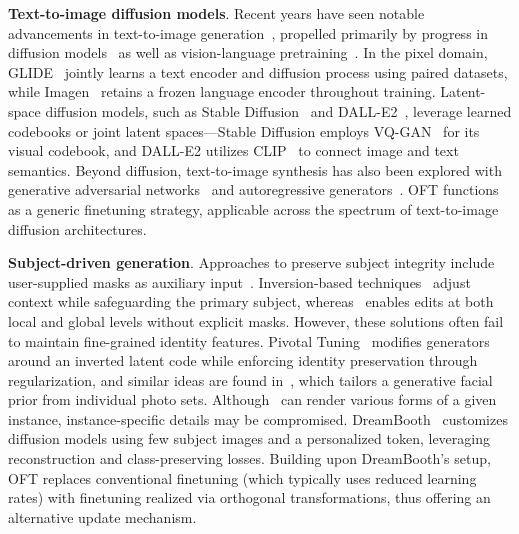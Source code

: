 \textbf{Text-to-image diffusion models}. Recent years have seen notable advancements in text-to-image generation~\cite{saharia2022photorealistic,ramesh2022hierarchical,rombach2022high,gu2022vector,nichol2022glide}, propelled primarily by progress in diffusion models~\cite{ho2020denoising,song2021score,song2021denoising,dhariwal2021diffusion} as well as vision-language pretraining~\cite{su2020vlbert,lu2019vilbert,radford2021learning,wang2021simvlm,li2022blip,li2023blip,alayrac2022flamingo,schuhmann2022laion}. In the pixel domain, GLIDE~\cite{nichol2022glide} jointly learns a text encoder and diffusion process using paired datasets, while Imagen~\cite{saharia2022photorealistic} retains a frozen language encoder throughout training. Latent-space diffusion models, such as Stable Diffusion~\cite{rombach2022high} and DALL-E2~\cite{ramesh2022hierarchical}, leverage learned codebooks or joint latent spaces—Stable Diffusion employs VQ-GAN~\cite{esser2021taming} for its visual codebook, and DALL-E2 utilizes CLIP~\cite{radford2021learning} to connect image and text semantics. Beyond diffusion, text-to-image synthesis has also been explored with generative adversarial networks~\cite{reed2016generative,zhang2017stackgan,xu2018attngan,li2019controllable} and autoregressive generators~\cite{ramesh2021zero,ding2021cogview,wu2022nuwa,yuscaling}. OFT functions as a generic finetuning strategy, applicable across the spectrum of text-to-image diffusion architectures.

\textbf{Subject-driven generation}. Approaches to preserve subject integrity include user-supplied masks as auxiliary input~\cite{avrahami2022blended,nichol2022glide}. Inversion-based techniques~\cite{choi2021ilvr,dhariwal2021diffusion,ramesh2022hierarchical,gal2022image} adjust context while safeguarding the primary subject, whereas~\cite{hertz2022prompt} enables edits at both local and global levels without explicit masks. However, these solutions often fail to maintain fine-grained identity features. Pivotal Tuning~\cite{roich2022pivotal} modifies generators around an inverted latent code while enforcing identity preservation through regularization, and similar ideas are found in~\cite{nitzan2022mystyle}, which tailors a generative facial prior from individual photo sets. Although~\cite{casanova2021instance} can render various forms of a given instance, instance-specific details may be compromised. DreamBooth~\cite{ruiz2023dreambooth} customizes diffusion models using few subject images and a personalized token, leveraging reconstruction and class-preserving losses. Building upon DreamBooth’s setup, OFT replaces conventional finetuning (which typically uses reduced learning rates) with finetuning realized via orthogonal transformations, thus offering an alternative update mechanism.

